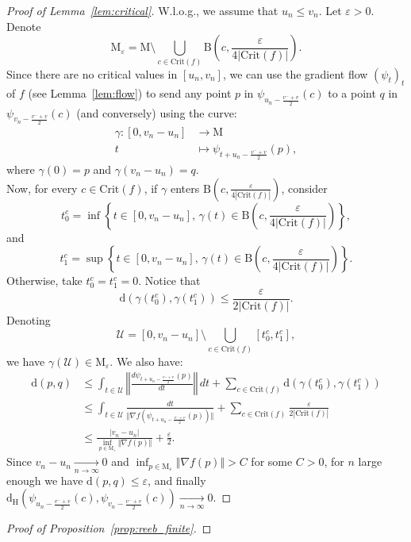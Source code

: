 \documentclass[pdflatex,sn-mathphys-ay]{sn-jnl}%
\newcommand{\man}{\mathrm{M}}
\newcommand{\dis}{\mathrm{d}}
\newcommand{\critic}{{\mathrm {Crit}}}
\newcommand{\haus}{{\mathrm {d_H}}}
\newcommand{\ball}{{\mathrm {B}}}
\newcommand{\converge}{\underset{n\rightarrow\infty}{\longrightarrow}}
\newcommand{\eps}{\varepsilon}
\theoremstyle{thmstyleone}%
\begin{document}
\begin{appendices}
\begin{proof}[Proof of Lemma~\ref{lem:critical}]
W.l.o.g., we assume that $u_n\leq v_n$. 
Let $\eps>0$. Denote $$\man_\eps=\man\setminus\bigcup_{c\in\critic(f)}\ball\left(c,\frac{\eps}{4\left|\critic(f)\right|}\right).$$ 
Since there are no critical values in $[u_n,v_n]$, we can use the gradient flow $(\psi_t)_t$ of $f$ (see Lemma~\ref{lem:flow}) to send any point $p$ in $\psi_{u_n-\frac{v^-+v}{2}}(c)$ to a point $q$ in $\psi_{v_n-\frac{v^-+v}{2}}(c)$ (and conversely) using the curve:
 \begin{align*}
 \gamma\colon[0,v_n-u_n]&\longrightarrow \man\\
 t&\longmapsto\psi_{t+u_n-\frac{v^-+v}{2}}(p),
 \end{align*}
where $\gamma(0)=p$ and $\gamma(v_n-u_n)=q$.\\
Now, for every $c\in\critic(f)$, if $\gamma$ enters $\ball\left(c,\frac{\eps}{4\left|\critic(f)\right|}\right)$, consider 
$$t^c_0=\inf\left\{t\in[0,v_n-u_n],\,\gamma(t)\in \ball\left(c,\frac{\eps}{4\left|\critic(f)\right|}\right)\right\},$$
and 
$$t^c_1=\sup\left\{t\in[0,v_n-u_n],\,\gamma(t)\in \ball\left(c,\frac{\eps}{4\left|\critic(f)\right|}\right)\right\}.$$
Otherwise, take $t^c_0=t^c_1=0$.
Notice that
$$\dis(\gamma(t^c_0),\gamma(t^c_1))\leq \frac{\eps}{2\left|\critic(f)\right|}.$$
 Denoting
 $$\mathcal{U}=[0,v_n-u_n]\setminus\bigcup_{c \in \critic(f)}[t^c_0,t^c_1],$$
 we have $\gamma\left(\mathcal{U}\right)\in\man_\eps$. We also  have:
\begin{align*}
\dis(p,q)&\leq\int_{t\in \mathcal{U}}\left\Vert\frac{d\psi_{t+u_n-\frac{v^-+v}{2}}(p)}{dt}\right\Vert\,dt + \sum_{c \in \critic(f)} \dis(\gamma(t^c_0),\gamma(t^c_1)) \\
&\leq\int_{t\in \mathcal{U}}\frac{dt}{\Vert\nabla f(\psi_{t+u_n-\frac{v^-+v}{2}}(p))\Vert} + \sum_{c \in \critic(f)} \frac{\eps}{2\left|\critic(f)\right|}\\
&\leq\frac{|v_n-u_n|}{\inf_{p\in\man_\eps}\Vert\nabla f(p)\Vert}+ \frac{\eps}{2}.
\end{align*}
Since $v_n-u_n\converge 0$ and $\inf_{p\in\man_\eps}\Vert\nabla f(p)\Vert > C$ for some $C>0$, for $n$ large enough we have $\dis(p,q)\leq\eps$, and finally $\haus(\psi_{u_n-\frac{v^-+v}{2}}(c),\psi_{v_n-\frac{v^-+v}{2}}(c))\converge 0$.

\end{proof}
 

\begin{proof}[Proof of Proposition~\ref{prop:reeb_finite}]


\end{proof}
\end{appendices}
\end{document}
